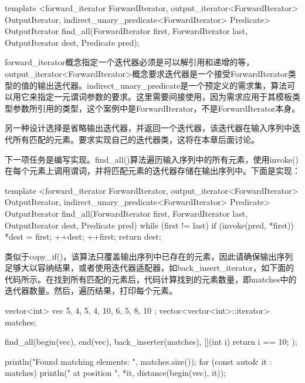 \begin{cpp}
template <forward_iterator ForwardIterator,
          output_iterator<ForwardIterator> OutputIterator,
          indirect_unary_predicate<ForwardIterator> Predicate>
OutputIterator find_all(ForwardIterator first, ForwardIterator last,
                        OutputIterator dest, Predicate pred);
\end{cpp}

forward\_iterator概念指定一个迭代器必须是可以解引用和递增的等，output\_iterator<ForwardIterator>概念要求迭代器是一个接受ForwardIterator类型的值的输出迭代器。indirect\_unary\_predicate是一个预定义的需求集，算法可以用它来指定一元谓词参数的要求。这里需要间接使用，因为需求应用于其模板类型参数所引用的类型，这个案例中是ForwardIterator，不是ForwardIterator本身。

另一种设计选择是省略输出迭代器，并返回一个迭代器，该迭代器在输入序列中迭代所有匹配的元素。要求实现自己的迭代器类，这将在本章后面讨论。

下一项任务是编写实现。find\_all()算法遍历输入序列中的所有元素，使用invoke()在每个元素上调用谓词，并将匹配元素的迭代器存储在输出序列中。下面是实现：

\begin{cpp}
template <forward_iterator ForwardIterator,
          output_iterator<ForwardIterator> OutputIterator,
          indirect_unary_predicate<ForwardIterator> Predicate>
OutputIterator find_all(ForwardIterator first, ForwardIterator last,
                        OutputIterator dest, Predicate pred)
{
    while (first != last) {
        if (invoke(pred, *first)) {
            *dest = first;
            ++dest;
        }
        ++first;
    }
    return dest;
}
\end{cpp}

类似于copy\_if()，该算法只覆盖输出序列中已存在的元素，因此请确保输出序列足够大以容纳结果，或者使用迭代器适配器，如back\_insert\_iterator，如下面的代码所示。在找到所有匹配的元素后，代码计算找到的元素数量，即matches中的迭代器数量。然后，遍历结果，打印每个元素。

\begin{cpp}
vector<int> vec { 5, 4, 5, 4, 10, 6, 5, 8, 10 };
vector<vector<int>::iterator> matches;

find_all(begin(vec), end(vec), back_inserter(matches),
    [](int i){ return i == 10; });

println("Found {} matching elements: ", matches.size());
for (const auto& it : matches) {
    println("{} at position {}", *it, distance(begin(vec), it));
}
\end{cpp}

